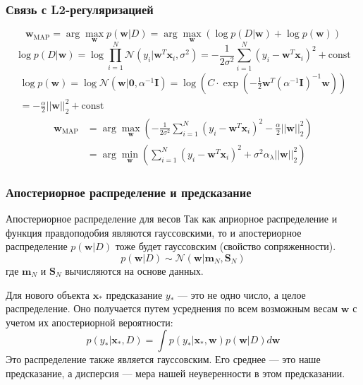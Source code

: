 \documentclass[notheorems, handout]{beamer}
\newcommand{\vect}[1]{\mathbf{#1}}
\newcommand{\matr}[1]{\boldsymbol{#1}}
\begin{document}
\begin{frame}
  \frametitle{Связь с L2-регуляризацией}
  $$ \mathbf{w}_{\text{MAP}} = \arg\max_{\mathbf{w}} p(\mathbf{w}|D)
  = \arg\max_{\mathbf{w}} \left( \log p(D|\mathbf{w}) + \log
  p(\mathbf{w}) \right) $$
  \[
    \log p(D|\mathbf{w}) = \log \prod_{i=1}^N
    \mathcal{N}(y_i|\mathbf{w}^T\mathbf{x}_i, \sigma^2) =
    -\frac{1}{2\sigma^2} \sum_{i=1}^N (y_i -
    \mathbf{w}^T\mathbf{x}_i)^2 + \text{const}
  \]
  \begin{multline*}   \log p(\mathbf{w}) = \log
    \mathcal{N}(\mathbf{w}|\mathbf{0}, \alpha^{-1}\mathbf{I})  = \log
    \left( C \cdot
      \exp\left(-\frac{1}{2}\mathbf{w}^T(\alpha^{-1}\mathbf{I})^{-1}\mathbf{w}\right)
    \right) \\
    =  -\frac{\alpha}{2} ||\mathbf{w}||_2^2 + \text{const}
  \end{multline*}
  \begin{align*}
    \mathbf{w}_{\text{MAP}} &= \arg\max_{\mathbf{w}} \left(
      -\frac{1}{2\sigma^2} \sum_{i=1}^N (y_i -
    \mathbf{w}^T\mathbf{x}_i)^2 - \frac{\alpha}{2} ||\mathbf{w}||_2^2 \right) \\
    &= \arg\min_{\mathbf{w}} \left( \sum_{i=1}^N (y_i -
      \mathbf{w}^T\mathbf{x}_i)^2 + \sigma^2\alpha_{\lambda}
    ||\mathbf{w}||_2^2 \right)
  \end{align*}

\end{frame}

\begin{frame}
  \frametitle{Апостериорное распределение и предсказание}
  \begin{block}{Апостериорное распределение для весов}
    Так как априорное распределение и функция правдоподобия являются
    гауссовскими, то и апостериорное распределение $p(\vect{w}|D)$
    тоже будет гауссовским (свойство сопряженности).
    $$ p(\vect{w}|D) \sim \mathcal{N}(\vect{w} | \vect{m}_N, \matr{S}_N) $$
    где $\vect{m}_N$ и $\matr{S}_N$ вычисляются на основе данных.
  \end{block}

  Для нового объекта $\vect{x}_*$ предсказание $y_*$ --- это не одно
  число, а целое распределение. Оно получается путем усреднения по
  всем возможным весам $\vect{w}$ с учетом их апостериорной вероятности:
  \[ p(y_*|\vect{x}_*, D) = \int p(y_*|\vect{x}_*, \vect{w})
  p(\vect{w}|D) d\vect{w} \]
  Это распределение также является гауссовским. Его среднее --- это
  наше предсказание, а дисперсия --- мера нашей неуверенности в этом
  предсказании.
\end{frame}
\end{document}
